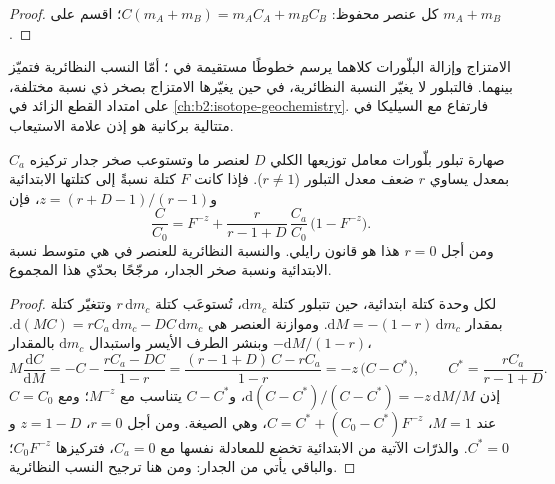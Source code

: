 \begin{proof}
كل عنصر محفوظ: $C(m_A + m_B) = m_AC_A + m_BC_B$؛ اقسم على $m_A + m_B$.
\end{proof}

الامتزاج وإزالة البلّورات كلاهما يرسم خطوطًا مستقيمة في ؛ أمّا النسب
النظائرية فتميّز بينهما. فالتبلور لا يغيّر النسبة النظائرية، في حين
يغيّرها الامتزاج بصخر ذي نسبة مختلفة، على امتداد القطع الزائد في
\cref{ch:b2:isotope-geochemistry}. فارتفاع  مع السيليكا في
متتالية بركانية هو إذن علامة الاستيعاب.

\begin{proposition}
\label{prop:b2:magmatic-differentiation:afc}
صهارة تبلور بلّورات معامل توزيعها الكلي $D$ لعنصر ما
وتستوعب صخر جدار تركيزه $C_a$ بمعدل يساوي $r$ ضعف معدل
التبلور ($r \ne 1$). فإذا كانت $F$ كتلة  نسبةً إلى كتلتها
الابتدائية و$z = (r + D - 1)/(r - 1)$، فإن
\[
\frac{C}{C_0} = F^{-z} + \frac{r}{r - 1 + D}\,\frac{C_a}{C_0}\,\bigl(1 - F^{-z}\bigr).
\]
ومن أجل $r = 0$ هذا هو قانون رايلي. والنسبة النظائرية للعنصر في 
هي متوسط نسبة  الابتدائية ونسبة صخر الجدار، مرجّحًا
بحدّي هذا المجموع.
\end{proposition}

\begin{proof}
لكل وحدة كتلة ابتدائية، حين تتبلور كتلة $\mathrm dm_c$، تُستوعَب كتلة
$r\,\mathrm dm_c$ وتتغيّر كتلة  بمقدار $\mathrm dM =
-(1-r)\,\mathrm dm_c$. وموازنة العنصر هي $\mathrm d(MC) = rC_a\,\mathrm dm_c -
DC\,\mathrm dm_c$. وبنشر الطرف الأيسر واستبدال $\mathrm dm_c$ بالمقدار
$-\mathrm dM/(1-r)$،
\[
M\frac{\mathrm dC}{\mathrm dM} = -C - \frac{rC_a - DC}{1-r}
= \frac{(r - 1 + D)\,C - rC_a}{1 - r} = -z\,\bigl(C - C^*\bigr),
\qquad C^* = \frac{rC_a}{r - 1 + D}.
\]
إذن $\mathrm d(C - C^*)/(C - C^*) = -z\,\mathrm dM/M$، و$C - C^*$ يتناسب
مع $M^{-z}$؛ ومع $C = C_0$ عند $M = 1$، $C = C^* + (C_0 - C^*)F^{-z}$، وهي
الصيغة. ومن أجل $r = 0$، $z = 1 - D$ و$C^* = 0$. والذرّات الآتية من
 الابتدائية تخضع للمعادلة نفسها مع $C_a = 0$، فتركيزها
$C_0F^{-z}$؛ والباقي يأتي من الجدار: ومن هنا ترجيح النسب النظائرية.
\end{proof}

